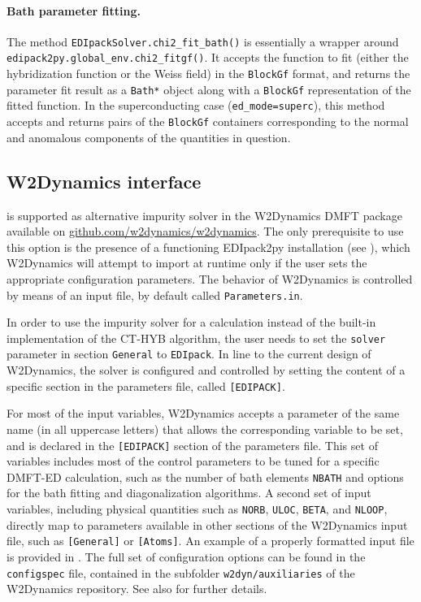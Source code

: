 \documentclass[edipack_sp.tex]{subfiles}
\begin{document}
\paragraph{{\bf Bath parameter fitting}.}
The method {\tt EDIpackSolver.chi2\_fit\_bath()} is essentially a wrapper around
{\tt edipack2py.global\_env.chi2\_fitgf()}. It accepts the function to fit (either
the hybridization function or the Weiss field) in the {\tt BlockGf} format,
and returns the parameter fit result as a {\tt Bath*} object along with a
{\tt BlockGf} representation of the fitted function. In the superconducting
case ({\tt ed\_mode=superc}), this method accepts and returns pairs of
the {\tt BlockGf} containers corresponding to the normal and anomalous 
components of the quantities in question.





\subsection{W2Dynamics interface}\label{sSecInteropW2DYN}
\NAME is supported as alternative impurity solver in the W2Dynamics DMFT package \cite{Wallerberger2019CPC} available on \href{https://github.com/w2dynamics/w2dynamics}{github.com/w2dynamics/w2dynamics}. The only prerequisite to use this option is the presence of a functioning EDIpack2py installation (see ), which W2Dynamics will attempt to import at runtime only if the user sets the appropriate configuration parameters.
The  behavior of W2Dynamics is controlled by means of an input file, by default called
{\tt Parameters.in}.

In order to use the \NAME impurity solver for a calculation instead of the built-in implementation of the CT-HYB algorithm, the user needs to set the {\tt solver} parameter in section {\tt General} to {\tt EDIpack}. 
In line to the current design of W2Dynamics, the \NAME solver is configured and controlled by setting the content of a specific section in the parameters file, called {\tt [EDIPACK]}.

For most of the \NAME input variables, W2Dynamics accepts a parameter of the same name (in all uppercase letters) that allows the corresponding variable to be set, and is declared in the {\tt [EDIPACK]} section of the parameters file. This set of variables includes most of the control parameters to be tuned for a specific DMFT-ED calculation, such as the number of bath elements {\tt NBATH} and options for the bath fitting and diagonalization algorithms. 
%
A second set of input variables, including physical quantities such as {\tt NORB}, {\tt ULOC}, {\tt BETA}, and {\tt   NLOOP}, directly map to parameters available in other sections of the W2Dynamics input file, such as {\tt [General]} or {\tt [Atoms]}. An example of a properly formatted input file is provided in . The full set of configuration options can be found in the {\tt configspec} file, contained in the subfolder {\tt w2dyn/auxiliaries} of the W2Dynamics repository. See also \cite{Wallerberger2019CPC}
for further details.
\end{document}
